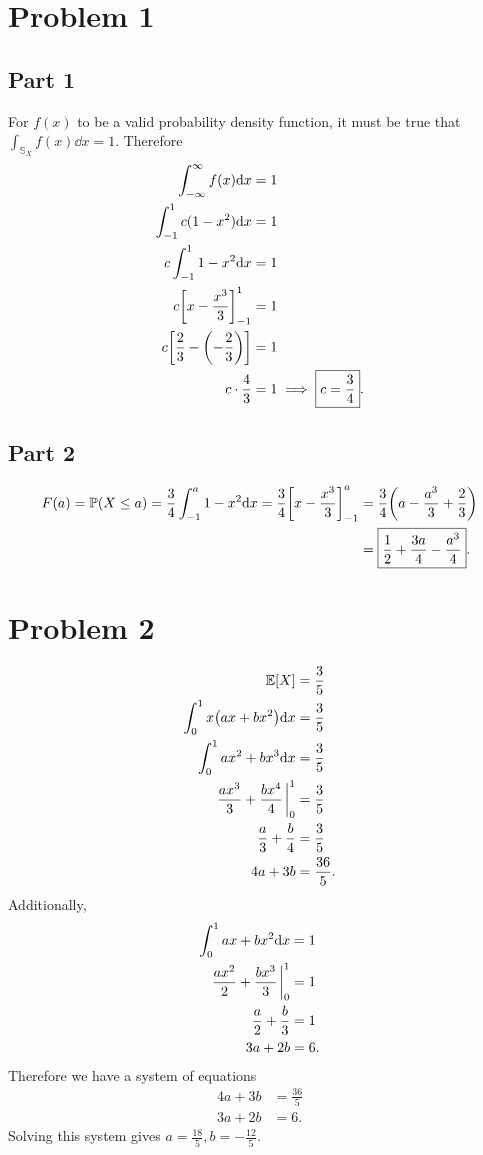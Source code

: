 \documentclass[12pt]{extarticle}
\begin{document}
\section*{Problem 1}
\subsection*{Part 1}
For $f(x)$ to be a valid probability density function, it must be true that $\int_{\mathbb{S}_X} f(x) \dd x = 1$. Therefore
\begin{align*}
	\int_{-\infty}^{\infty} f(x) \dd x &= 1 \\
	\int_{-1}^{1} c(1-x^2) \dd x &= 1 \\
	c \int_{-1}^{1} 1-x^2 \dd x &= 1 \\
	c \qty[x - \frac{x^3}{3}]_{-1}^{1} &= 1 \\
	c \qty[\frac{2}{3} - \qty(-\frac{2}{3})] &= 1 \\
	c \cdot \frac{4}{3} &= 1 \implies \boxed{c = \frac{3}{4}}
.\end{align*}

\subsection*{Part 2}
\begin{align*}
	F(a) = \mathbb{P}\qty(X \leq a) = \frac{3}{4} \int_{-1}^{a} 1 - x^2 \dd x = \frac{3}{4} \qty[x - \frac{x^3}{3}]_{-1}^a &= \frac{3}{4} \qty(a - \frac{a^3}{3} + \frac{2}{3}) \\
																												  &= \boxed{\frac{1}{2} + \frac{3a}{4} - \frac{a^3}{4}}
.\end{align*}

\section*{Problem 2}
\begin{align*}
	\Exp{X} &= \frac{3}{5} \\
	\int_0^1 x \qty(ax + bx^2) \dd x &= \frac{3}{5} \\
	\int_0^1 ax^2 + bx^3 \dd x &= \frac{3}{5} \\
	\frac{ax^3}{3} + \frac{bx^4}{4} \eval_0^1 &= \frac{3}{5} \\
	\frac{a}{3} + \frac{b}{4} &= \frac{3}{5} \\
	4a + 3b &= \frac{36}{5}
.\end{align*}
Additionally,
\begin{align*}
	\int_0^1 ax + bx^2 \dd x &= 1 \\
	\frac{ax^2}{2} + \frac{bx^3}{3} \eval_0^1 &= 1 \\
	\frac{a}{2} + \frac{b}{3} &= 1 \\
	3a + 2b &= 6
.\end{align*}
Therefore we have a system of equations
\begin{align*}
	4a + 3b &= \frac{36}{5} \\
	3a + 2b &= 6
.\end{align*}
Solving this system gives $a = \frac{18}{5}, b = -\frac{12}{5}$.
\end{document}
